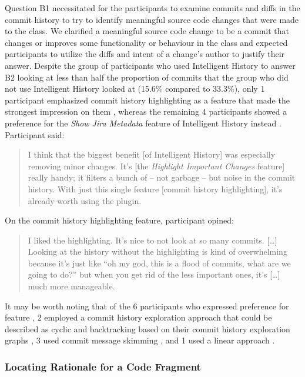 Question B1 necessitated for the participants to examine commits and diffs in the  commit history to try to identify meaningful source code changes that were made to the class.
We clarified a meaningful source code change to be a commit that changes or improves some functionality or behaviour in the class and expected participants to utilize the diffs and intent of a change's author to justify their answer.
Despite the group of participants who used Intelligent History to answer B2 looking at less than half the proportion of commits that the group who did not use Intelligent History looked at (15.6\% compared to 33.3\%),
only 1 participant emphasized commit history highlighting as a feature that made the strongest impression on them , whereas the remaining 4 participants showed a preference for the \textit{Show Jira Metadata} feature of Intelligent History instead .
Participant  said:

\begin{quote}
  I think that the biggest benefit [of Intelligent History] was especially removing minor changes. 
  It’s [the \textit{Highlight Important Changes} feature] really handy; it filters a bunch of -- not garbage -- but noise in the commit history. 
  With just this single feature [commit history highlighting], it’s already worth using the plugin.
\end{quote}

On the commit history highlighting feature, participant  opined:

\begin{quote}
  I liked the highlighting. 
  It’s nice to not look at so many commits. 
  [\dots] Looking at the history without the highlighting is kind of overwhelming because it’s just like ``oh my god, this is a flood of commits, what are we going to do?'' 
  but when you get rid of the less important ones, it’s [\dots] much more manageable.
\end{quote}

It may be worth noting that of the 6 participants who expressed preference for feature , 
2 employed a commit history exploration approach that could be described as cyclic and backtracking based on their commit history exploration graphs ,
3 used commit message skimming , and 1 used a linear approach .

\subsubsection{Locating Rationale for a Code Fragment}

